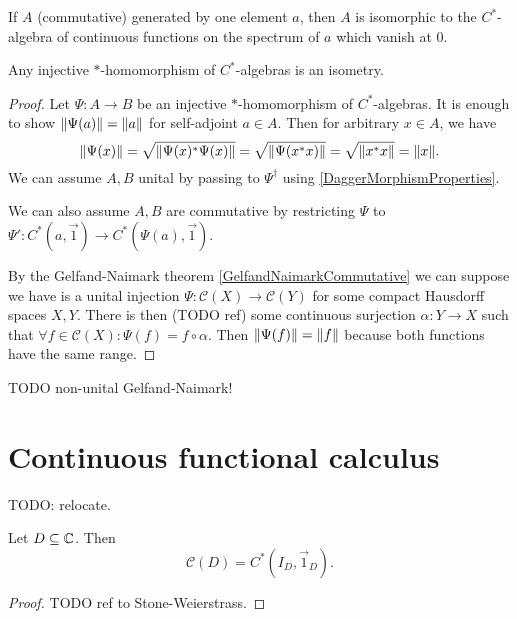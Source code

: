 \begin{proposition}
If $A$ (commutative) generated by one element $a$, then $A$ is isomorphic to the $C^*$-algebra of continuous functions on the spectrum of $a$ which vanish at $0$.
\end{proposition}

\begin{proposition}
Any injective $*$-homomorphism of $C^*$-algebras is an isometry.
\end{proposition}
\begin{proof}
Let $\Psi:A\to B$ be an injective $*$-homomorphism of $C^*$-algebras. It is enough to show $\lVert\Psi(a)\rVert = \lVert a\rVert$ for self-adjoint $a\in A$. Then for arbitrary $x\in A$, we have
\[ \lVert\Psi(x)\rVert = \sqrt{\lVert\Psi(x)^*\Psi(x)\rVert} = \sqrt{\lVert\Psi(x^*x)\rVert} = \sqrt{\lVert x^*x\rVert} = \lVert x\rVert. \]
We can assume $A,B$ unital by passing to $\Psi^\dagger$ using \ref{DaggerMorphismProperties}.

We can also assume $A, B$ are commutative by restricting $\Psi$ to $\Psi': C^*(a,\vec{1}) \to C^*(\Psi(a),\vec{1})$.

By the Gelfand-Naimark theorem \ref{GelfandNaimarkCommutative} we can suppose we have is a unital injection $\Psi: \mathcal{C}(X)\to \mathcal{C}(Y)$ for some compact Hausdorff spaces $X,Y$. There is then (TODO ref) some continuous surjection $\alpha: Y\to X$ such that $\forall f\in\mathcal{C}(X): \Psi(f) = f\circ \alpha$. Then $\lVert\Psi(f)\rVert = \lVert f\rVert$ because both functions have the same range.
\end{proof}

TODO non-unital Gelfand-Naimark!

\section{Continuous functional calculus}

TODO: relocate.
\begin{lemma} \label{WeierstrassApproximation}
Let $D\subseteq \mathbb{C}$. Then
\[ \mathcal{C}(D) = C^*(I_D, \vec{1}_D). \]
\end{lemma}
\begin{proof}
TODO ref to Stone-Weierstrass.
\end{proof}

